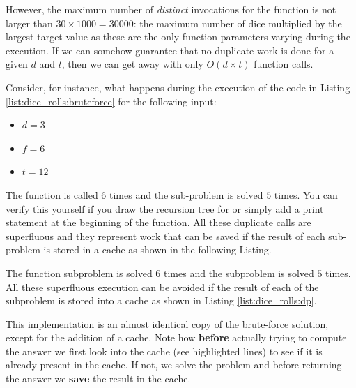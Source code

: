However, the maximum number of \textit{distinct} invocations for the function
 is not larger than $30\times 1000 = 30000$: the maximum number of dice multiplied by the largest target value as these are the only function parameters varying during the execution. If we can somehow guarantee that no
duplicate work is done for a given $d$ and $t$, then we can get away with only $O(d\times t)$
function calls. 

Consider, for instance, what happens during the execution of the code
in Listing \ref{list:dice_rolls:bruteforce} for the following input:
\begin{itemize}
	\item $d = 3$
	\item $f = 6$
	\item $t = 12$
\end{itemize}


The function  is called  $6$ times and the
sub-problem  is solved $5$ times.
You can verify this yourself if you draw the recursion tree for  or simply add a print statement at the beginning of the function.
All these duplicate calls are superfluous and they represent work that can be saved if the result of each sub-problem is stored in a
cache as shown in the following Listing.


The function subproblem  is solved $6$ times and the
subproblem  is solved $5$ times. All
these superfluous execution can be avoided if the result of each of the subproblem is stored into a cache as shown in Listing \ref{list:dice_rolls:dp}. 




This implementation is an almost identical copy
of the brute-force solution, except for the addition of a cache. Note how \textbf{before} actually trying
to compute the answer we first look into the cache (see highlighted lines) to see if it is already present in the cache. If not, we solve the
problem and before returning the answer we \textbf{save} the result in the cache.

